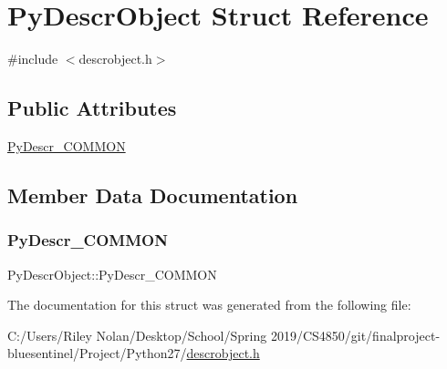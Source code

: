 \hypertarget{struct_py_descr_object}{}\section{Py\+Descr\+Object Struct Reference}
\label{struct_py_descr_object}


{\ttfamily \#include $<$descrobject.\+h$>$}

\subsection*{Public Attributes}
\begin{DoxyCompactItemize}
\item 
\mbox{\hyperlink{struct_py_descr_object_a03274b9110571f8814b5a62ebd32776a}{Py\+Descr\+\_\+\+C\+O\+M\+M\+ON}}
\end{DoxyCompactItemize}


\subsection{Member Data Documentation}
\mbox{\label{struct_py_descr_object_a03274b9110571f8814b5a62ebd32776a}} 
\subsubsection{\texorpdfstring{PyDescr\_COMMON}{PyDescr\_COMMON}}
{\footnotesize\ttfamily Py\+Descr\+Object\+::\+Py\+Descr\+\_\+\+C\+O\+M\+M\+ON}



The documentation for this struct was generated from the following file\+:\begin{DoxyCompactItemize}
\item 
C\+:/\+Users/\+Riley Nolan/\+Desktop/\+School/\+Spring 2019/\+C\+S4850/git/finalproject-\/bluesentinel/\+Project/\+Python27/\mbox{\hyperlink{descrobject_8h}{descrobject.\+h}}\end{DoxyCompactItemize}
